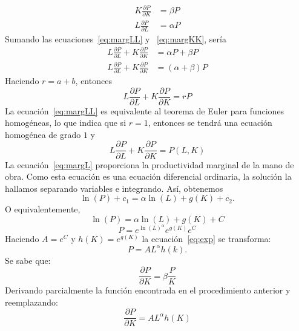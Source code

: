 \begin{align}
K\frac{\partial P}{\partial K}
&=\beta P\label{eq:margLL}\\
L\frac{\partial P}{\partial L}
&=\alpha P\label{eq:margKK}
\end{align}
Sumando las ecuaciones~\eqref{eq:margLL} y ~\eqref{eq:margKK}, sería
\begin{align}
L\frac{\partial P}{\partial L}+K\frac{\partial P}{\partial K}
&=\alpha P+\beta P\label{eq:margLLL}\\
L\frac{\partial P}{\partial L}+K\frac{\partial P}{\partial K}
&=\left(\alpha+\beta\right)P\label{eq:margKKK}
\end{align}
Haciendo $r=a+b$, entonces
\begin{equation}
L\frac{\partial P}{\partial L}+K\frac{\partial P}{\partial K}=rP
\end{equation}
La ecuación~\eqref{eq:margLL} es equivalente al teorema de Euler para funciones homogéneas, lo que indica que si $r=1$, entonces se tendrá una ecuación homogénea de grado $1$ y
\begin{equation}
L\frac{\partial P}{\partial L}+K\frac{\partial P}{\partial K}=P\left(L,K\right)
\end{equation}
La ecuación~\eqref{eq:margL} proporciona la productividad marginal de la mano de obra. Como esta ecuación es una ecuación diferencial ordinaria, la solución la hallamos separando variables e integrando. Así, obtenemos
\begin{equation}
\ln\left(P\right)+c_{1}=\alpha\ln\left(L\right)+g\left(K\right)+c_{2}.
\end{equation}
O equivalentemente,
\begin{equation}
\ln\left(P\right)=\alpha\ln\left(L\right)+g\left(K\right)+C
\end{equation}
\begin{equation}\label{eq:exp}
P=e^{\ln\left(L\right)^{\alpha}}e^{g\left(K\right)}e^{C}
\end{equation}
Haciendo $A=e^{C}$ y $h\left(K\right)=e^{g\left(K\right)}$ la ecuación~\eqref{eq:exp} se transforma:
\begin{equation}
P=AL^{\alpha}h\left(k\right).
\end{equation}
Se sabe que:
\begin{equation}
\frac{\partial P}{\partial K}=\beta\frac{P}{K}
\end{equation}
Derivando parcialmente la función encontrada en el procedimiento anterior y reemplazando:
\begin{equation}
\frac{\partial P}{\partial K}=AL^{\alpha}h\left(K\right)
\end{equation}
